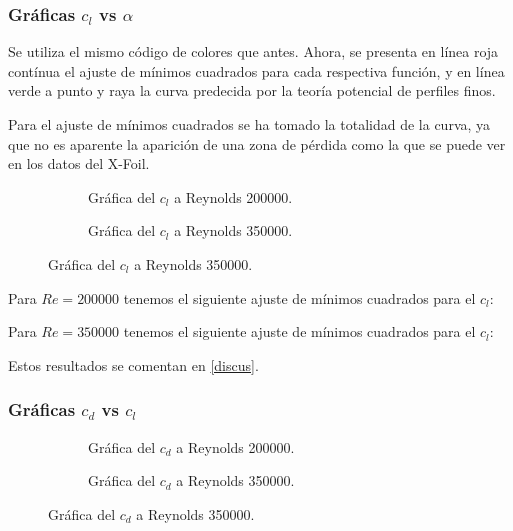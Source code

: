 \documentclass{article}
\begin{document}
\subsubsection{Gráficas \texorpdfstring{$c_l$}{lift} vs \texorpdfstring{$\alpha$}{alpha}}

Se utiliza el mismo código de colores que antes. Ahora, se presenta en línea roja contínua el ajuste de 
mínimos cuadrados para cada respectiva función, y en línea verde a punto y raya la curva predecida por la 
teoría potencial de perfiles finos.

Para el ajuste de mínimos cuadrados se ha tomado la totalidad de la curva, ya que no es aparente la 
aparición de una zona de pérdida como la que se puede ver en los datos del X-Foil. 

\begin{figure}[H]
    \centering
    \begin{subfigure}{.48\textwidth}
        \resizebox{\linewidth}{!}{}
        \caption{Gráfica del $c_l$ a Reynolds 200000. }
        \label{fig:res9}    
    \end{subfigure}
    \hspace{0cm}
    \begin{subfigure}{.48\textwidth}
        \resizebox{\linewidth}{!}{}
        \caption{Gráfica del $c_l$ a Reynolds 350000. }
        \label{fig:res10}     
    \end{subfigure}
\end{figure}

Para $Re = 200000$ tenemos el siguiente ajuste de mínimos cuadrados para el $c_l$:




Para $Re = 350000$ tenemos el siguiente ajuste de mínimos cuadrados para el $c_l$:



Estos resultados se comentan en \ref{discus}.

\newpage
\subsubsection{Gráficas \texorpdfstring{$c_d$}{drag} vs \texorpdfstring{$c_l$}{lift}}

\begin{figure}[H]
    \centering
    \begin{subfigure}{.48\textwidth}
        \resizebox{\linewidth}{!}{}
        \caption{Gráfica del $c_d$ a Reynolds 200000. }
        \label{fig:res11}    
    \end{subfigure}
    \hspace{0cm}
    \begin{subfigure}{.48\textwidth}
        \resizebox{\linewidth}{!}{}
        \caption{Gráfica del $c_d$ a Reynolds 350000. }
        \label{fig:res12}     
    \end{subfigure}
\end{figure}
\end{document}
